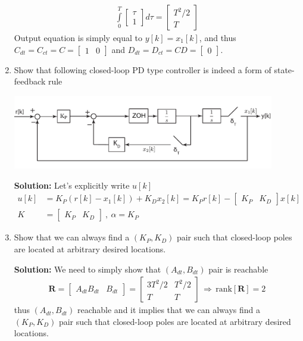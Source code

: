 \documentclass[twoside]{article}
\begin{document}
\begin{enumerate}
\begin{align*}
 \int\limits_{0}^{T}  \begin{bmatrix} \tau \\ 1 \end{bmatrix}  d\tau = 
 \begin{bmatrix} T^2/2 \\ T \end{bmatrix} 
\end{align*}
%
Output equation is simply equal to $y[k] = x_1[k]$, and thus $C_{dt} = C_{ct} = C = \begin{bmatrix} 1 & 0 \end{bmatrix} $
and $D_{dt} = D_{ct} = CD= \begin{bmatrix} 0 \end{bmatrix} $.

\item Show that following closed-loop PD type controller is indeed a form of state-feedback rule
		
\begin{center}
  \begin{minipage}[h]{0.9\linewidth}
    \begin{center}
      \includegraphics[width=0.9\textwidth]{block_PD}
    \end{center}
  \end{minipage}
    \end{center}
		
\textbf{Solution:} Let's explicitly write $u[k]$
%
\begin{align*}
u[k] &= K_P (r[k] - x_1[k]) + K_D x_2[k] = K_P r[k] - \begin{bmatrix} K_P & K_D \end{bmatrix} x[k] \\
K &= \begin{bmatrix} K_P & K_D \end{bmatrix} \ , \ \alpha = K_P
\end{align*}
%
\item Show that we can always find a $(K_P,K_D)$ pair such that closed-loop poles are located
at arbitrary desired locations. 

\textbf{Solution:} We need to simply show that $(A_{dt} , B_{dt})$ pair is reachable
%
\begin{align*}
\mathbf{R} = \left[ \begin{array}{c|c} A_{dt} B_{dt} & B_{dt} \end{array} \right] = 
\left[ \begin{array}{c|c} 3 T^2 /2 & T^2/2 \\ T & T \end{array} \right] \, \Rightarrow \, \mathrm{rank}[\mathbf{R}] = 2  
\end{align*}
%
thus $(A_{dt} , B_{dt})$ reachable and it implies that we can always find a $(K_P,K_D)$ pair such that closed-loop poles are located
at arbitrary desired locations. 


\end{enumerate}
\end{document}
